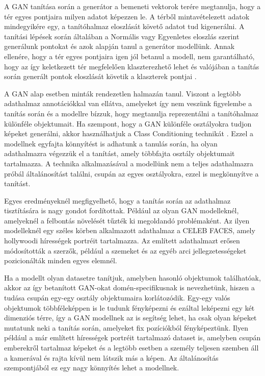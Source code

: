 
A GAN tanítása során a generátor a bemeneti vektorok terére megtanulja, hogy a tér egyes pontjaira milyen adatot képezzen le. A térből mintavételezett adatok mindegyikére egy, a tanítóhalmaz eloszlását követő adatot tud kigenerálni.
A tanítási lépések során általában a Normális vagy Egyenletes eloszlás szerint generálunk pontokat és azok alapján tanul a generátor modellünk. Annak ellenére, hogy a tér egyes pontjaira igen jól betanul a modell, nem garantálható, hogy az így keletkezett tér megfelelően klaszterezhető lehet és valójában a tanítás során generált pontok eloszlását követik a klaszterek pontjai \cite{mukherjee2019clustergan}.


A GAN alap esetben minták rendezetlen halmazán tanul. Viszont a legtöbb adathalmaz annotációkkal van ellátva, amelyeket így nem veszünk figyelembe a tanítás során és a modellre bízzuk, hogy megtanulja reprezentálni a tanítóhalmaz különféle objektumait. Ha szempont, hogy a GAN különféle osztályokra tudjon képeket generálni, akkor használhatjuk a Class Conditioning technikát \cite{mirza2014conditional}. Ezzel a modellnek egyfajta könnyítést is adhatunk a tanulás során, ha olyan adathalmazra végezzük el a tanítást, amely többfajta osztály objektumait tartalmazza. A technika alkalmazásával a modellünk nem a teljes adathalmazra próbál általánosítást találni, csupán az egyes osztályokra, ezzel is megkönnyítve a tanítást.

Egyes eredményeknél megfigyelhető, hogy a tanítás során az adathalmaz tisztítására is nagy gondot fordítottak. Például az olyan GAN modelleknél, amelyeknél a felbontás növelését tűzték ki megoldandó problémaként. Az ilyen modelleknél egy széles körben alkalmazott adathalmaz a CELEB FACES, amely hollywoodi hírességek portréit tartalmazza. Az említett adathalmazt erősen módosították a szerzők, például a szemeket és az egyéb arci jellegzetességeket pozicionálták minden egyes elemnél.

Ha a modellt olyan datasetre tanítjuk, amelyben hasonló objektumok találhatóak, akkor az így betanított GAN-okat domén-specifikusnak is nevezhetünk, hiszen a tudása csupán egy-egy osztály objektumaira korlátozódik. Egy-egy valós objektumok többféleképpen is le tudunk fényképezni és ezáltal leképezni egy két dimenziós térre, így a GAN modellnek az is segítség lehet, ha csak olyan képeket mutatunk neki a tanítás során, amelyeket fix pozíciókból fényképeztünk.
Ilyen például a már említett hírességek portréit tartalmazó dataset is, amelyben csupán emberekről tartalmaz képeket és a legtöbb esetben a személy teljesen szemben áll a kamerával és rajta kívül nem látszik más a képen. Az általánosítás szempontjából ez egy nagy könnyítés lehet a modellnek.

